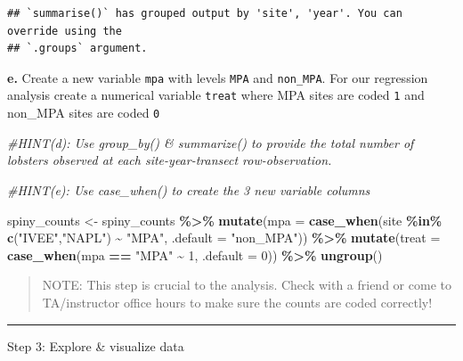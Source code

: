 \documentclass[
]{article}
\newenvironment{Shaded}{\begin{snugshade}}{\end{snugshade}}
\newcommand{\AttributeTok}[1]{\textcolor[rgb]{0.13,0.29,0.53}{#1}}
\newcommand{\CommentTok}[1]{\textcolor[rgb]{0.56,0.35,0.01}{\textit{#1}}}
\newcommand{\DecValTok}[1]{\textcolor[rgb]{0.00,0.00,0.81}{#1}}
\newcommand{\FunctionTok}[1]{\textcolor[rgb]{0.13,0.29,0.53}{\textbf{#1}}}
\newcommand{\NormalTok}[1]{#1}
\newcommand{\OtherTok}[1]{\textcolor[rgb]{0.56,0.35,0.01}{#1}}
\newcommand{\SpecialCharTok}[1]{\textcolor[rgb]{0.81,0.36,0.00}{\textbf{#1}}}
\newcommand{\StringTok}[1]{\textcolor[rgb]{0.31,0.60,0.02}{#1}}
\begin{document}
\begin{verbatim}
## `summarise()` has grouped output by 'site', 'year'. You can override using the
## `.groups` argument.
\end{verbatim}

\textbf{e.} Create a new variable \texttt{mpa} with levels \texttt{MPA}
and \texttt{non\_MPA}. For our regression analysis create a numerical
variable \texttt{treat} where MPA sites are coded \texttt{1} and
non\_MPA sites are coded \texttt{0}

\begin{Shaded}
\begin{Highlighting}[]
\CommentTok{\#HINT(d): Use \textasciigrave{}group\_by()\textasciigrave{} \& \textasciigrave{}summarize()\textasciigrave{} to provide the total number of lobsters observed at each site{-}year{-}transect row{-}observation. }

\CommentTok{\#HINT(e): Use \textasciigrave{}case\_when()\textasciigrave{} to create the 3 new variable columns}

\NormalTok{spiny\_counts }\OtherTok{\textless{}{-}}\NormalTok{ spiny\_counts }\SpecialCharTok{\%\textgreater{}\%}
  \FunctionTok{mutate}\NormalTok{(}\AttributeTok{mpa =} \FunctionTok{case\_when}\NormalTok{(site }\SpecialCharTok{\%in\%} \FunctionTok{c}\NormalTok{(}\StringTok{"IVEE"}\NormalTok{,}\StringTok{"NAPL"}\NormalTok{) }\SpecialCharTok{\textasciitilde{}} \StringTok{"MPA"}\NormalTok{,}
                                       \AttributeTok{.default =} \StringTok{"non\_MPA"}\NormalTok{)) }\SpecialCharTok{\%\textgreater{}\%}
  \FunctionTok{mutate}\NormalTok{(}\AttributeTok{treat =} \FunctionTok{case\_when}\NormalTok{(mpa }\SpecialCharTok{==} \StringTok{"MPA"} \SpecialCharTok{\textasciitilde{}} \DecValTok{1}\NormalTok{,}
                           \AttributeTok{.default =} \DecValTok{0}\NormalTok{)) }\SpecialCharTok{\%\textgreater{}\%}
  \FunctionTok{ungroup}\NormalTok{()}
\end{Highlighting}
\end{Shaded}

\begin{quote}
NOTE: This step is crucial to the analysis. Check with a friend or come
to TA/instructor office hours to make sure the counts are coded
correctly!
\end{quote}

\begin{center}\rule{0.5\linewidth}{0.5pt}\end{center}

Step 3: Explore \& visualize data
\end{document}
